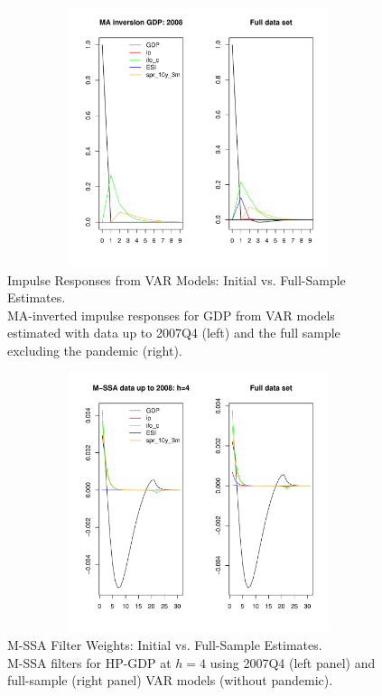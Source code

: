 \documentclass[11pt,a4paper]{article}
\begin{document}
\begin{figure}[htbp]
    \begin{center}
        \includegraphics[height=3in, width=4.5in]{./Figures/up_dated_ma_inv_multi_ip.pdf}
        \caption{Impulse Responses from VAR Models: Initial vs. Full-Sample Estimates.\\
        MA-inverted impulse responses for GDP from VAR models estimated with data up to 2007Q4 (left) and the full sample excluding the pandemic (right). 
        \label{fig:up_dated_ma_inv_multi_ip}}
    \end{center}
\end{figure}

\begin{figure}[htbp]
    \begin{center}
        \includegraphics[height=3in, width=4.5in]{./Figures/bk_2008_all.pdf}
        \caption{M-SSA Filter Weights: Initial vs. Full-Sample Estimates.\\
        M-SSA filters for HP-GDP at $h=4$ using 2007Q4 (left panel) and full-sample (right panel) VAR models (without pandemic).
        \label{fig:bk_2008_all}}
    \end{center}
\end{figure}
\end{document}
